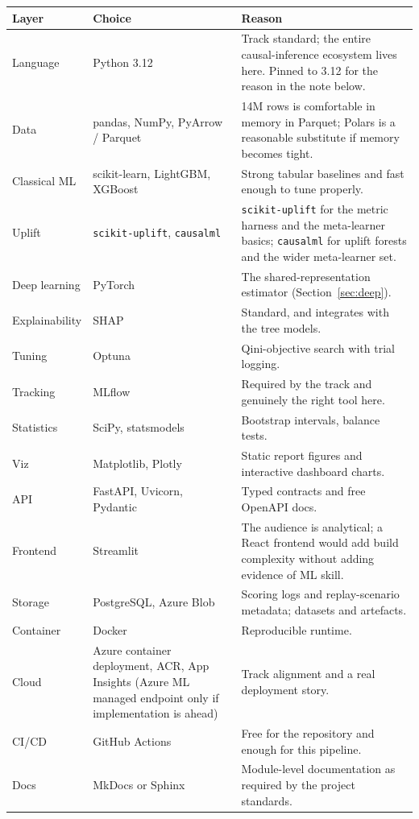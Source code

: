 \documentclass[11pt,a4paper]{article}
\begin{document}
\begin{tabularx}{\textwidth}{@{}L{3.4cm}L{4.6cm}X@{}}
\toprule
\textbf{Layer} & \textbf{Choice} & \textbf{Reason} \\
\midrule
Language & Python 3.12 & Track standard; the entire causal-inference ecosystem lives here.
Pinned to 3.12 for the reason in the note below. \\
Data & pandas, NumPy, PyArrow / Parquet & 14M rows is comfortable in memory in Parquet; Polars is a
reasonable substitute if memory becomes tight. \\
Classical ML & scikit-learn, LightGBM, XGBoost & Strong tabular baselines and fast enough to tune
properly. \\
Uplift & \texttt{scikit-uplift}, \texttt{causalml} & \texttt{scikit-uplift} for the metric harness
and the meta-learner basics; \texttt{causalml} for uplift forests and the wider meta-learner set. \\
Deep learning & PyTorch & The shared-representation estimator (Section~\ref{sec:deep}). \\
Explainability & SHAP & Standard, and integrates with the tree models. \\
Tuning & Optuna & Qini-objective search with trial logging. \\
Tracking & MLflow & Required by the track and genuinely the right tool here. \\
Statistics & SciPy, statsmodels & Bootstrap intervals, balance tests. \\
Viz & Matplotlib, Plotly & Static report figures and interactive dashboard charts. \\
API & FastAPI, Uvicorn, Pydantic & Typed contracts and free OpenAPI docs. \\
Frontend & Streamlit & The audience is analytical; a React frontend would add build complexity
without adding evidence of ML skill. \\
Storage & PostgreSQL, Azure Blob & Scoring logs and replay-scenario metadata; datasets and
artefacts. \\
Container & Docker & Reproducible runtime. \\
Cloud & Azure container deployment, ACR, App Insights (Azure ML managed endpoint only if
implementation is ahead) & Track alignment and a real deployment story. \\
CI/CD & GitHub Actions & Free for the repository and enough for this pipeline. \\
Docs & MkDocs or Sphinx & Module-level documentation as required by the project standards. \\
\bottomrule
\end{tabularx}
\end{document}
